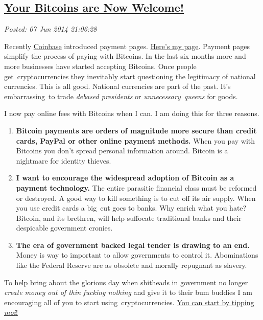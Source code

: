 %

\subsection*{\href{http://bakerjd99.wordpress.com/2014/06/07/your-bitcoins-are-now-welcome/}{Your Bitcoins are Now Welcome!}}


\noindent\emph{Posted: 07 Jun 2014 21:06:28}
\vspace{6pt}

Recently \href{https://coinbase.com/}{Coinbase} introduced payment
pages. \href{https://coinbase.com/bakerjd99}{Here's my page}. Payment
pages simplify the process of paying with Bitcoins. In the last six
months more and more businesses have started accepting Bitcoins. Once
people get~cryptocurrencies they inevitably start questioning the
legitimacy of national currencies. This is all good. National currencies
are part of the past. It's embarrassing~to trade \emph{debased
presidents} or \emph{unnecessary~queens} for goods.

I now pay online fees with Bitcoins when I can. I am doing this for
three reasons.

\begin{enumerate}
\item
  \textbf{Bitcoin payments are orders of magnitude more secure than
  credit cards, PayPal or other online payment methods.} When you pay
  with Bitcoins you don't spread personal information around. Bitcoin is
  a nightmare for identity thieves.
\item
  \textbf{I want to encourage the widespread adoption of Bitcoin as a
  payment technology.} The entire parasitic financial class must be
  reformed or destroyed. A good way to kill something is to cut off its
  air supply. When you use credit cards a big~cut goes
  to banks. Why enrich what you hate? Bitcoin, and its brethren, will
  help suffocate traditional banks and their despicable government
  cronies.
\item
  \textbf{The era of government backed legal tender is drawing to an
  end.} Money is way to important to allow governments to control it.
  Abominations like the Federal Reserve are as obsolete and morally
  repugnant as slavery.
\end{enumerate}

To help bring about the glorious day when shitheads in government no
longer \emph{create money out of thin fucking nothing} and give it to their
bum buddies I am encouraging all of you to start using~cryptocurrencies.
\href{https://coinbase.com/bakerjd99}{You can start by
tipping \emph{moi}!}



%